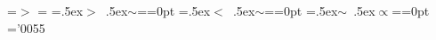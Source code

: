 \newbox\grsign \setbox\grsign=\hbox{$>$} \newdimen\grdimen \grdimen=\ht\grsign
\newbox\simlessbox \newbox\simgreatbox
\setbox\simgreatbox=\hbox{\raise.5ex\hbox{$>$}\llap
     {\lower.5ex\hbox{$\sim$}}}=\grdimen{}=0pt
\setbox\simlessbox=\hbox{\raise.5ex\hbox{$<$}\llap
     {\lower.5ex\hbox{$\sim$}}}=\grdimen{}=0pt
\def\simgreat{\mathrel{\copy\simgreatbox}}
\def\simless{\mathrel{\copy\simlessbox}}
\newbox\simppropto
\setbox\simppropto=\hbox{\raise.5ex\hbox{$\sim$}\llap
     {\lower.5ex\hbox{$\propto$}}}=\grdimen{}=0pt
\def\simpropto{\mathrel{\copy\simppropto}}
\def\today{\ifcase\month\or
  January\or February\or March\or April\or May\or June\or
  July\or August\or September\or October\or November\or December\fi
  \space\number\day, \number\year}
\mathchardef\hyph='0055


